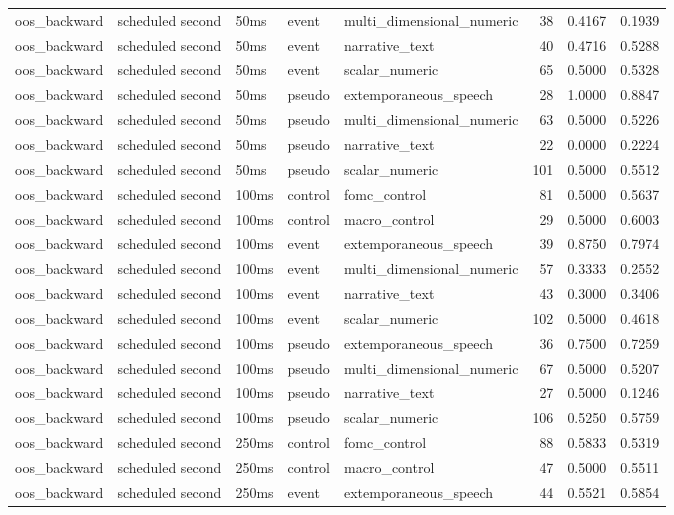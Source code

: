 \begin{tabular}{lllllrrr}
oos_backward & scheduled second & 50ms & event & multi_dimensional_numeric & 38 & 0.4167 & 0.1939 \\
oos_backward & scheduled second & 50ms & event & narrative_text & 40 & 0.4716 & 0.5288 \\
oos_backward & scheduled second & 50ms & event & scalar_numeric & 65 & 0.5000 & 0.5328 \\
oos_backward & scheduled second & 50ms & pseudo & extemporaneous_speech & 28 & 1.0000 & 0.8847 \\
oos_backward & scheduled second & 50ms & pseudo & multi_dimensional_numeric & 63 & 0.5000 & 0.5226 \\
oos_backward & scheduled second & 50ms & pseudo & narrative_text & 22 & 0.0000 & 0.2224 \\
oos_backward & scheduled second & 50ms & pseudo & scalar_numeric & 101 & 0.5000 & 0.5512 \\
oos_backward & scheduled second & 100ms & control & fomc_control & 81 & 0.5000 & 0.5637 \\
oos_backward & scheduled second & 100ms & control & macro_control & 29 & 0.5000 & 0.6003 \\
oos_backward & scheduled second & 100ms & event & extemporaneous_speech & 39 & 0.8750 & 0.7974 \\
oos_backward & scheduled second & 100ms & event & multi_dimensional_numeric & 57 & 0.3333 & 0.2552 \\
oos_backward & scheduled second & 100ms & event & narrative_text & 43 & 0.3000 & 0.3406 \\
oos_backward & scheduled second & 100ms & event & scalar_numeric & 102 & 0.5000 & 0.4618 \\
oos_backward & scheduled second & 100ms & pseudo & extemporaneous_speech & 36 & 0.7500 & 0.7259 \\
oos_backward & scheduled second & 100ms & pseudo & multi_dimensional_numeric & 67 & 0.5000 & 0.5207 \\
oos_backward & scheduled second & 100ms & pseudo & narrative_text & 27 & 0.5000 & 0.1246 \\
oos_backward & scheduled second & 100ms & pseudo & scalar_numeric & 106 & 0.5250 & 0.5759 \\
oos_backward & scheduled second & 250ms & control & fomc_control & 88 & 0.5833 & 0.5319 \\
oos_backward & scheduled second & 250ms & control & macro_control & 47 & 0.5000 & 0.5511 \\
oos_backward & scheduled second & 250ms & event & extemporaneous_speech & 44 & 0.5521 & 0.5854 \\

\end{tabular}
